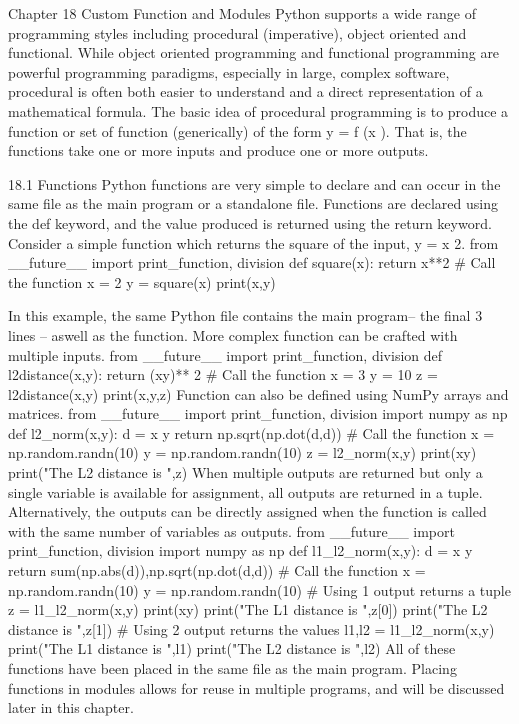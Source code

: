 Chapter 18
Custom Function and Modules
Python supports a wide range of programming styles including procedural (imperative), object oriented
and functional. While object oriented programming and functional programming are powerful programming
paradigms, especially in large, complex software, procedural is often both easier to understand and a
direct representation of a mathematical formula. The basic idea of procedural programming is to produce
a function or set of function (generically) of the form
y = f (x ).
That is, the functions take one or more inputs and produce one or more outputs.

18.1 Functions
Python functions are very simple to declare and can occur in the same file as the main program or a standalone
file. Functions are declared using the def keyword, and the value produced is returned using the
return keyword. Consider a simple function which returns the square of the input, y = x 2.
from __future__ import print_function, division
def square(x):
return x**2
# Call the function
x = 2
y = square(x)
print(x,y)

In this example, the same Python file contains the main program– the final 3 lines – aswell as the function.
More complex function can be crafted with multiple inputs.
from __future__ import print_function, division
def l2distance(x,y):
return (xy)**
2
# Call the function
x = 3
y = 10
z = l2distance(x,y)
print(x,y,z)
Function can also be defined using NumPy arrays and matrices.
from __future__ import print_function, division
import numpy as np
def l2_norm(x,y):
d = x y
return np.sqrt(np.dot(d,d))
# Call the function
x = np.random.randn(10)
y = np.random.randn(10)
z = l2_norm(x,y)
print(xy)
print("The L2 distance is ",z)
When multiple outputs are returned but only a single variable is available for assignment, all outputs are
returned in a tuple. Alternatively, the outputs can be directly assigned when the function is called with
the same number of variables as outputs.
from __future__ import print_function, division
import numpy as np
def l1_l2_norm(x,y):
d = x y
return sum(np.abs(d)),np.sqrt(np.dot(d,d))
# Call the function
x = np.random.randn(10)
y = np.random.randn(10)
# Using 1 output returns a tuple
z = l1_l2_norm(x,y)
print(xy)
print("The L1 distance is ",z[0])
print("The L2 distance is ",z[1])
# Using 2 output returns the values
l1,l2 = l1_l2_norm(x,y)
print("The L1 distance is ",l1)
print("The L2 distance is ",l2)
All of these functions have been placed in the same file as the main program. Placing functions in modules
allows for reuse in multiple programs, and will be discussed later in this chapter.


